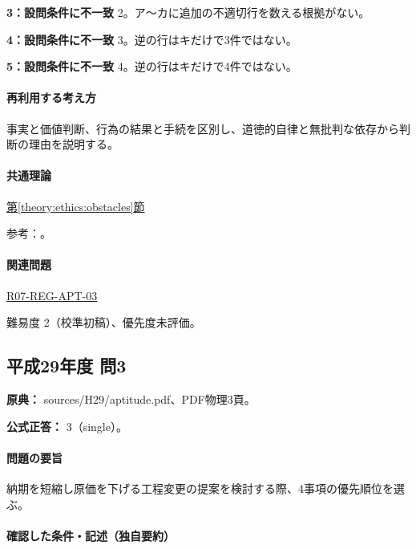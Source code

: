 \noindent\textbf{3：設問条件に不一致} 2。ア〜カに追加の不適切行を数える根拠がない。\par

\noindent\textbf{4：設問条件に不一致} 3。逆の行はキだけで3件ではない。\par

\noindent\textbf{5：設問条件に不一致} 4。逆の行はキだけで4件ではない。\par

\paragraph{再利用する考え方} 事実と価値判断、行為の結果と手続を区別し、道徳的自律と無批判な依存から判断の理由を説明する。

\paragraph{共通理論} \hyperref[theory:ethics:obstacles]{第\ref*{theory:ethics:obstacles}節}

\par 参考：\cite{davis_seven_steps}。

\paragraph{関連問題} \hyperref[q:r07-reg-apt-03]{R07-REG-APT-03}

\par 難易度 2（校準初稿）、優先度未評価。

\subsection{平成29年度 問3}
\label{q:h29-reg-apt-03}

\noindent\textbf{原典：} sources/H29/aptitude.pdf、PDF物理3頁。

\textbf{公式正答：} 3（single）。

\paragraph{問題の要旨} 納期を短縮し原価を下げる工程変更の提案を検討する際、4事項の優先順位を選ぶ。

\paragraph{確認した条件・記述（独自要約）}\mbox{}\par

